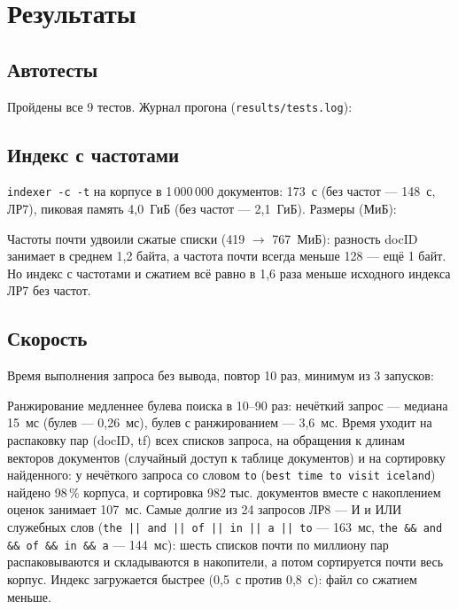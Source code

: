 \section{Результаты}
\subsection{Автотесты}
Пройдены все 9 тестов. Журнал прогона (\texttt{results/tests.log}):

{\scriptsize
{}
}

\subsection{Индекс с частотами}
\texttt{indexer -c -t} на корпусе в 1\,000\,000 документов: 173~с (без частот --- 148~с, ЛР7), пиковая память 4,0~ГиБ (без частот --- 2,1~ГиБ). Размеры (МиБ):
\begin{center}
\small

\end{center}
Частоты почти удвоили сжатые списки (419 $\to$ 767~МиБ): разность docID занимает в среднем 1,2 байта, а частота почти всегда меньше 128 --- ещё 1 байт. Но индекс с частотами и сжатием всё равно в 1,6 раза меньше исходного индекса ЛР7 без частот.

\subsection{Скорость}
Время выполнения запроса без вывода, повтор 10 раз, минимум из 3 запусков:
\begin{center}
\small

\end{center}
{\footnotesize
\setlength{\tabcolsep}{4pt}
\begin{center}

\end{center}
}
Ранжирование медленнее булева поиска в 10--90 раз: нечёткий запрос --- медиана 15~мс (булев --- 0,26~мс), булев с ранжированием --- 3,6~мс. Время уходит на распаковку пар (docID, tf) всех списков запроса, на обращения к длинам векторов документов (случайный доступ к таблице документов) и на сортировку найденного: у нечёткого запроса со словом \texttt{to} (\texttt{best time to visit iceland}) найдено 98\,\% корпуса, и сортировка 982 тыс. документов вместе с накоплением оценок занимает 107~мс. Самые долгие из 24 запросов ЛР8 --- И и ИЛИ служебных слов (\texttt{the || and || of || in || a || to} --- 163~мс, \texttt{the \&\& and \&\& of \&\& in \&\& a} --- 144~мс): шесть списков почти по миллиону пар распаковываются и складываются в накопители, а потом сортируется почти весь корпус. Индекс загружается быстрее (0,5~с против 0,8~с): файл со сжатием меньше.

